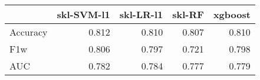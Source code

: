 \begin{tabular}{lrrrr}
\toprule
{} &  skl-SVM-l1 &  skl-LR-l1 &  skl-RF &  xgboost \\
\midrule
Accuracy &       0.812 &      0.810 &   0.807 &    0.810 \\
F1w      &       0.806 &      0.797 &   0.721 &    0.798 \\
AUC      &       0.782 &      0.784 &   0.777 &    0.779 \\
\bottomrule
\end{tabular}
